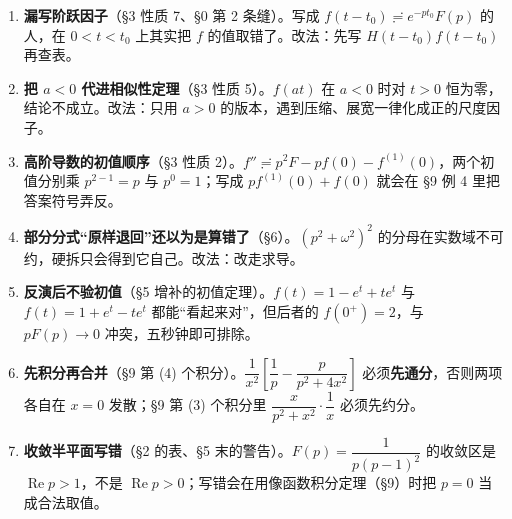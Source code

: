 \documentclass[11pt]{ctexart}
\begin{document}





\begin{enumerate}
\item \textbf{漏写阶跃因子}（§3 性质 7、§0 第 2 条缝）。写成 $f(t-t_0)\risingdotseq e^{-pt_0}F(p)$ 的人，在 $0<t<t_0$ 上其实把 $f$ 的值取错了。改法：先写 $H(t-t_0)f(t-t_0)$ 再查表。

\item \textbf{把 $a<0$ 代进相似性定理}（§3 性质 5）。$f(at)$ 在 $a<0$ 时对 $t>0$ 恒为零，结论不成立。改法：只用 $a>0$ 的版本，遇到压缩、展宽一律化成正的尺度因子。

\item \textbf{高阶导数的初值顺序}（§3 性质 2）。$f''\risingdotseq p^{2}F-pf(0)-f^{(1)}(0)$，两个初值分别乘 $p^{2-1}=p$ 与 $p^{0}=1$；写成 $pf^{(1)}(0)+f(0)$ 就会在 §9 例 4 里把答案符号弄反。

\item \textbf{部分分式“原样退回”还以为是算错了}（§6）。$(p^{2}+\omega^{2})^{2}$ 的分母在实数域不可约，硬拆只会得到它自己。改法：改走求导。

\item \textbf{反演后不验初值}（§5 增补的初值定理）。$f(t)=1-e^{t}+te^{t}$ 与 $f(t)=1+e^{t}-te^{t}$ 都能“看起来对”，但后者的 $f(0^{+})=2$，与 $pF(p)\to0$ 冲突，五秒钟即可排除。

\item \textbf{先积分再合并}（§9 第 (4) 个积分）。$\dfrac{1}{x^{2}}\left[\dfrac{1}{p}-\dfrac{p}{p^{2}+4x^{2}}\right]$ 必须\textbf{先通分}，否则两项各自在 $x=0$ 发散；§9 第 (3) 个积分里 $\dfrac{x}{p^{2}+x^{2}}\cdot\dfrac{1}{x}$ 必须先约分。

\item \textbf{收敛半平面写错}（§2 的表、§5 末的警告）。$F(p)=\dfrac{1}{p(p-1)^{2}}$ 的收敛区是 $\operatorname{Re}p>1$，不是 $\operatorname{Re}p>0$；写错会在用像函数积分定理（§9）时把 $p=0$ 当成合法取值。
\end{enumerate}
\end{document}
